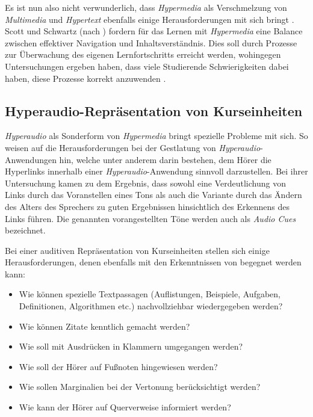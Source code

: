 Es ist nun also nicht verwunderlich, dass \textit{Hypermedia} als Verschmelzung von \textit{Multimedia} und \textit{Hypertext} ebenfalls einige Herausforderungen mit sich bringt \citep{moos2010multimedia}. Scott und Schwartz (nach \cite{moos2010multimedia}) fordern für das Lernen mit \textit{Hypermedia} eine Balance zwischen effektiver Navigation und Inhaltsverständnis. Dies soll durch Prozesse zur Überwachung des eigenen Lernfortschritts erreicht werden, wohingegen Untersuchungen ergeben haben, dass viele Studierende Schwierigkeiten dabei haben, diese Prozesse korrekt anzuwenden \citep{moos2010multimedia}.


\subsection{Hyperaudio-Repräsentation von Kurseinheiten}
\label{sec:hyperaudio}
\label{sec:audiocues}
\textit{Hyperaudio} als Sonderform von \textit{Hypermedia} bringt spezielle Probleme mit sich. So weisen \cite{donker2007gestaltung} auf die Herausforderungen bei der Gestlatung von \textit{Hyperaudio}-Anwendungen hin, welche unter anderem darin bestehen, dem Hörer die Hyperlinks innerhalb einer \textit{Hyperaudio}-Anwendung sinnvoll darzustellen. Bei ihrer Untersuchung kamen \cite{donker2007gestaltung} zu dem Ergebnis, \glqq dass sowohl eine Verdeutlichung von Links durch das Voranstellen eines Tons als auch die Variante durch das
Ändern des Alters des Sprechers zu guten Ergebnissen hinsichtlich des Erkennens des Links
führen.\grqq{} Die genannten vorangestellten Töne werden auch als \textit{Audio Cues} bezeichnet.

Bei einer auditiven Repräsentation von Kurseinheiten stellen sich einige Herausforderungen, denen ebenfalls mit den Erkenntnissen von \cite{donker2007gestaltung} begegnet werden kann:

\begin{itemize}
\item Wie können spezielle Textpassagen (Auflistungen, Beispiele, Aufgaben, Definitionen, Algorithmen etc.) nachvollziehbar wiedergegeben werden?
\item Wie können Zitate kenntlich gemacht werden?
\item Wie soll mit Ausdrücken in Klammern umgegangen werden?
\item Wie soll der Hörer auf Fußnoten hingewiesen werden?
\item Wie sollen Marginalien bei der Vertonung berücksichtigt werden?
\item Wie kann der Hörer auf Querverweise informiert werden?
\end{itemize} 

